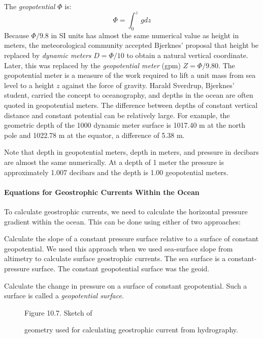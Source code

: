 The \textit{geopotential $\Phi$} is:
\begin{equation}
\Phi =\int_0^z\,g dz
\end{equation}
Because $\Phi/9.8$ in SI units has almost the same numerical value as
height in meters, the meteorological community accepted Bjerknes'
proposal that height be replaced by \textit{dynamic
  meters} $D = \Phi/10$ to obtain a
natural vertical coordinate. Later, this was replaced by the
\textit{geopotential meter} (gpm) $Z
= \Phi/9.80$. The geopotential meter is a measure of the work required
to lift a unit mass from sea level to a height $z$ against the force
of gravity. Harald Sverdrup, Bjerknes' student, carried the concept to
oceanography, and depths in the ocean are often quoted in geopotential
meters. The difference between depths of constant vertical distance
and constant potential can be relatively large. For example, the
geometric depth of the 1000 dynamic meter surface is 1017.40 m at the
north pole and 1022.78 m at the equator, a difference of 5.38 m.

Note that depth in geopotential meters, depth in meters, and pressure
in decibars are almost the same numerically. At a depth of 1 meter the
pressure is approximately 1.007 decibars and the depth is 1.00
geopotential meters.

\paragraph{Equations for Geostrophic Currents Within the Ocean}
To calculate geo\-strophic
currents, we need to calculate the horizontal pressure gradient
with\-in the ocean. This can be done using either of two approaches:
\begin{enumerate}
\vitem Calculate the slope of a constant pressure surface relative to
a surface of constant geopotential. We used this approach when we used
sea-surface slope from altimetry to calculate surface geostrophic
currents. The sea surface is a constant-pressure surface. The constant
geopotential surface was the geoid.

\vitem Calculate the change in pressure on a surface of constant
geopotential. Such a surface is called a \textit{geopotential
  surface}.
\end{enumerate}

\begin{figure}[h!]
\vspace{-2ex}
\centering
\footnotesize
Figure 10.7. Sketch of \rule{0mm}{3ex}geometry used for calculating
geostrophic current from hydrography.

\label{fig:hydrosketch}
\vspace{-2ex}
\end{figure}

